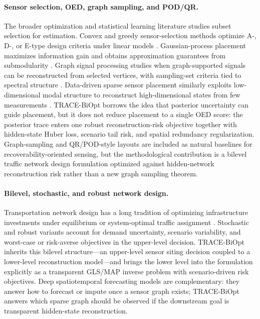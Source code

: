 \paragraph{Sensor selection, OED, graph sampling, and POD/QR.}
The broader optimization and statistical learning literature studies subset
selection for estimation.  Convex and greedy sensor-selection methods optimize
A-, D-, or E-type design criteria under linear models \citep{joshi2009sensor}.
Gaussian-process placement maximizes information gain and obtains approximation
guarantees from submodularity \citep{krause2008near,krause2008robust}.
Graph signal processing studies when graph-supported signals can be
reconstructed from selected vertices, with sampling-set criteria tied to
spectral structure \citep{chen2015sampling,anis2016sampling}.  Data-driven
sparse sensor placement similarly exploits low-dimensional modal structure to
reconstruct high-dimensional states from few measurements
\citep{manohar2018sparse}.  TRACE-BiOpt borrows the idea that posterior
uncertainty can guide placement, but it does not reduce placement to a single
OED score: the posterior trace enters one robust reconstruction-risk objective
together with hidden-state Huber loss, scenario tail risk, and spatial
redundancy regularization.  Graph-sampling and QR/POD-style layouts are
included as natural baselines for recoverability-oriented sensing, but the
methodological contribution is a bilevel traffic network design formulation
optimized against hidden-network reconstruction risk rather than a new graph
sampling theorem.

\paragraph{Bilevel, stochastic, and robust network design.}
Transportation network design has a long tradition of optimizing infrastructure
investments under equilibrium or system-optimal traffic assignment
\citep{yang1998optimal,meng2008bilevel}.  Stochastic and robust variants
account for demand uncertainty, scenario variability, and worst-case or
risk-averse objectives in the upper-level decision.  TRACE-BiOpt inherits this
bilevel structure---an upper-level sensor siting decision coupled to a
lower-level reconstruction model---and brings the lower level into the
formulation explicitly as a transparent GLS/MAP inverse problem with
scenario-driven risk objectives.  Deep spatiotemporal forecasting models
\citep{li2018dcrnn,yu2018stgcn} are complementary: they answer how to forecast
or impute once a sensor graph exists; TRACE-BiOpt answers which sparse graph
should be observed if the downstream goal is transparent hidden-state
reconstruction.

